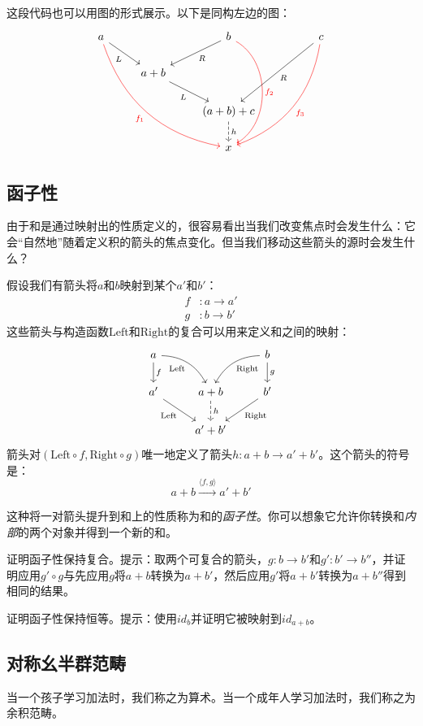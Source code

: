 \documentclass[DaoFP]{subfiles}
\begin{document}
这段代码也可以用图的形式展示。以下是同构左边的图：
\[
 \begin{tikzcd}
 a
 \arrow[rd, "L"']
 \arrow[rrddd, bend right, red, "f_1"']
 && b
 \arrow[ld, "R"]
 \arrow[ddd, bend left=60, red, "f_2"]
&&c
 \arrow[lldd, "R"]
 \arrow[llddd, bend left, red, "f_3"]
 \\
 & a + b
  \arrow[rd, "L"']
 \\
&&(a + b) + c
 \arrow[d, dashed, "h"]
\\
&& x
 \end{tikzcd}
\]
\subsection{函子性}
由于和是通过映射出的性质定义的，很容易看出当我们改变焦点时会发生什么：它会“自然地”随着定义积的箭头的焦点变化。但当我们移动这些箭头的源时会发生什么？

假设我们有箭头将$a$和$b$映射到某个$a'$和$b'$：
\begin{align*}f &\colon a \to a' \\
g &\colon b \to b' 
\end{align*}
这些箭头与构造函数$\text{Left}$和$\text{Right}$的复合可以用来定义和之间的映射：
\[
 \begin{tikzcd}
 a
 \arrow[d, "f"]
 \arrow[dr,  bend left, "\text{Left}"']
  && b
 \arrow[d, "g"]
 \arrow[dl, bend right, "\text{Right}"]
 \\
 a'
 \arrow[rd, "\text{Left}"']
&a + b
\arrow[d, dashed, "h"]
& b'
\arrow[ld, "\text{Right}"]
\\
& a' + b'
 \end{tikzcd}
\]
箭头对$(\text{Left} \circ f, \text{Right} \circ g)$唯一地定义了箭头$h \colon a + b \to a' + b'$。这个箭头的符号是：
\[ a + b \xrightarrow{\langle f, g \rangle} a' + b' \]

这种将一对箭头提升到和上的性质称为和的\emph{函子性}。你可以想象它允许你转换和\emph{内部}的两个对象并得到一个新的和。
\begin{exercise}
证明函子性保持复合。提示：取两个可复合的箭头，$g \colon b \to b'$和$g' \colon b' \to b''$，并证明应用$g' \circ g$与先应用$g$将$a + b$转换为$a + b'$，然后应用$g'$将$a + b'$转换为$a + b''$得到相同的结果。
\end{exercise}

\begin{exercise}
证明函子性保持恒等。提示：使用$id_b$并证明它被映射到$id_{a+b}$。
\end{exercise}

\subsection{对称幺半群范畴}
当一个孩子学习加法时，我们称之为算术。当一个成年人学习加法时，我们称之为余积范畴。
\end{document}
